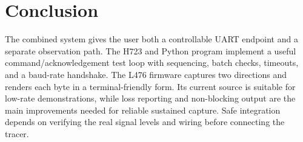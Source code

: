 \documentclass[10pt,a4paper]{article}
\begin{document}
\section{Conclusion}
The combined system gives the user both a controllable UART endpoint and a separate observation path. The H723 and Python program implement a useful command/acknowledgement test loop with sequencing, batch checks, timeouts, and a baud-rate handshake. The L476 firmware captures two directions and renders each byte in a terminal-friendly form. Its current source is suitable for low-rate demonstrations, while loss reporting and non-blocking output are the main improvements needed for reliable sustained capture. Safe integration depends on verifying the real signal levels and wiring before connecting the tracer.
\end{document}
